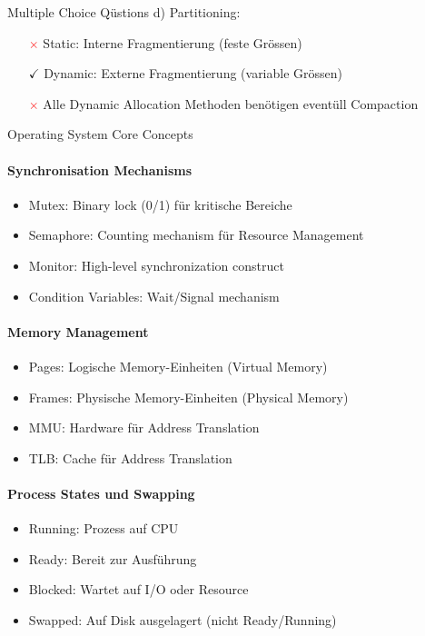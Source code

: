 \begin{example2}{Multiple Choice Qüstions}
    d) Partitioning:
    \begin{itemize}
        \item[\textcolor{red}{$\times$}] Static: Interne Fragmentierung (feste Grössen)
        \item[\textcolor{frog}{$\checkmark$}] Dynamic: Externe Fragmentierung (variable Grössen)
        \item[\textcolor{red}{$\times$}] Alle Dynamic Allocation Methoden benötigen eventüll Compaction
    \end{itemize}
\end{example2}

\begin{KR}{Operating System Core Concepts}
    \paragraph{Synchronisation Mechanisms}
    \begin{itemize}
        \item Mutex: Binary lock (0/1) für kritische Bereiche
        \item Semaphore: Counting mechanism für Resource Management
        \item Monitor: High-level synchronization construct
        \item Condition Variables: Wait/Signal mechanism
    \end{itemize}
    
    \paragraph{Memory Management}
    \begin{itemize}
        \item Pages: Logische Memory-Einheiten (Virtual Memory)
        \item Frames: Physische Memory-Einheiten (Physical Memory)  
        \item MMU: Hardware für Address Translation
        \item TLB: Cache für Address Translation
    \end{itemize}
    
    \paragraph{Process States und Swapping}
    \begin{itemize}
        \item Running: Prozess auf CPU
        \item Ready: Bereit zur Ausführung
        \item Blocked: Wartet auf I/O oder Resource
        \item Swapped: Auf Disk ausgelagert (nicht Ready/Running)
    \end{itemize}
    

\end{KR}
